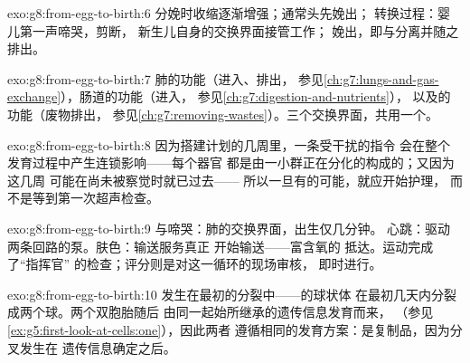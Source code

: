 \begin{solution}{exo:g8:from-egg-to-birth:6}
分娩时收缩逐渐增强；通常头先娩出；
转换过程：婴儿第一声啼哭，剪断，
新生儿自身的交换界面接管工作；
娩出，即与分离并随之排出。
\end{solution}

\begin{solution}{exo:g8:from-egg-to-birth:7}
肺的功能（进入、排出，
参见\cref{ch:g7:lungs-and-gas-exchange}），肠道的功能（进入，
参见\cref{ch:g7:digestion-and-nutrients}），
以及的功能（废物排出，
参见\cref{ch:g7:removing-wastes}）。三个交换界面，共用一个。
\end{solution}

\begin{solution}{exo:g8:from-egg-to-birth:8}
因为搭建计划的几周里，一条受干扰的指令
会在整个发育过程中产生连锁影响——每个器官
都是由一小群正在分化的构成的；又因为这几周
可能在尚未被察觉时就已过去——
所以一旦有的可能，就应开始护理，
而不是等到第一次超声检查。
\end{solution}

\begin{solution}{exo:g8:from-egg-to-birth:9}
与啼哭：肺的交换界面，出生仅几分钟。
心跳：驱动两条回路的泵。肤色：输送服务真正
开始输送——富含氧的
抵达。运动完成了“指挥官”
的检查；评分则是对这一循环的现场审核，
即时进行。
\end{solution}

\begin{solution}{exo:g8:from-egg-to-birth:10}
发生在最初的分裂中——的球状体
在最初几天内分裂成两个球。两个双胞胎随后
由同一起始所继承的遗传信息发育而来，
（参见\cref{ex:g5:first-look-at-cells:one}），因此两者
遵循相同的发育方案：是复制品，因为分叉发生在
遗传信息确定之后。
\end{solution}

